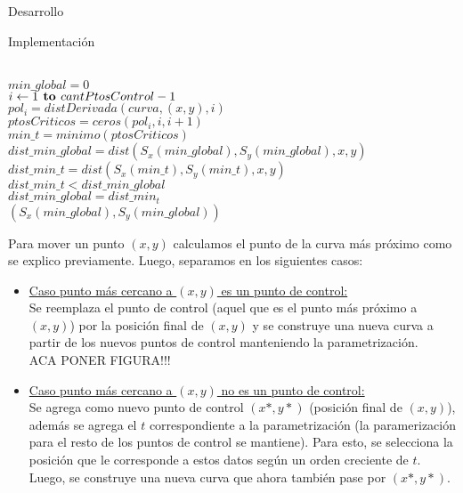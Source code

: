 \begin{section}{Desarrollo}
\begin{subsection}{Implementación}
\begin{itemize}
				\begin{pseudo}
					\\
					\tab $min\_global = 0$\\
					\tab \FOR $i\gets 1 \textbf{ to } cantPtosControl-1$\\
					\tab\tab $pol_i = distDerivada(curva,(x,y),i)$\\
					\tab\tab $ptosCriticos = ceros(pol_i,i,i+1)$\\
					\tab\tab $min\_t = minimo(ptosCriticos)$\\
					\tab\tab $dist\_min\_global = dist(S_x(min\_global),S_y(min\_global),x,y)$\\
					\tab\tab $dist\_min\_t = dist(S_x(min\_t),S_y(min\_t),x,y)$\\
					\tab\tab \IF $dist\_min\_t < dist\_min\_global$ \THEN\\
					\tab\tab\tab $dist\_min\_global = dist\_min_t$\\
					\tab \RET $(S_x(min\_global),S_y(min\_global))$\\
				\end{pseudo}
				
				Para mover un punto $(x,y)$	calculamos el punto de la curva más próximo como se explico previamente. Luego, separamos en los siguientes casos:
				
				\begin{itemize}
					\item \underline{Caso punto más cercano a $(x,y)$ es un punto de control:}\\
					
						Se reemplaza el punto de control (aquel que es el punto más próximo a $(x,y)$) por la posición final de $(x,y)$ y se construye una nueva curva a partir de los nuevos puntos de control manteniendo la parametrización.\\
						
						ACA PONER FIGURA!!!
					
					\item \underline{Caso punto más cercano a $(x,y)$ no es un punto de control:}\\
					
						Se agrega como nuevo punto de control $(x*,y*)$ (posición final de $(x,y)$), además se agrega el $t$ correspondiente a la parametrización (la paramerización para el resto de los puntos de control se mantiene).
						Para esto, se selecciona la posición que le corresponde a estos datos según un orden creciente de $t$. Luego, se construye una nueva curva que ahora también pase por $(x*,y*)$.\\
						

\end{itemize}
\end{itemize}
\end{subsection}
\end{section}
